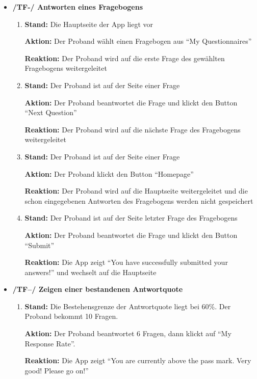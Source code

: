 \documentclass[a4paper]{scrreprt}
\begin{document}
\begin{itemize}
	        \item \textbf{/TF-/ Antworten eines Fragebogens}
	        \begin{enumerate}
	        	\item \par \textbf{Stand: }Die Hauptseite der App liegt vor
	        	\par \textbf{Aktion: }Der \gls{Proband} wählt einen Fragebogen aus ``My Questionnaires''
	        	\par \textbf{Reaktion: }Der \gls{Proband} wird auf die erste Frage des gewählten Fragebogens weitergeleitet
	        	\item \par \textbf{Stand: }Der \gls{Proband} ist auf der Seite einer Frage
	        	\par \textbf{Aktion: }Der \gls{Proband} beantwortet die Frage und klickt den Button ``Next Question''
	        	\par \textbf{Reaktion: }Der \gls{Proband} wird auf die nächste Frage des Fragebogens weitergeleitet
	        	\item \par \textbf{Stand: }Der \gls{Proband} ist auf der Seite einer Frage
	        	\par \textbf{Aktion: }Der \gls{Proband} klickt den Button ``Homepage''
	        	\par \textbf{Reaktion: }Der \gls{Proband} wird auf die Hauptseite weitergeleitet und die schon eingegebenen Antworten des Fragebogens werden nicht gespeichert
	        	\item \par \textbf{Stand: }Der \gls{Proband} ist auf der Seite letzter Frage des Fragebogens
	        	\par \textbf{Aktion: }Der \gls{Proband} beantwortet die Frage und klickt den Button ``Submit''
	        	\par \textbf{Reaktion: }Die App zeigt ``You have successfully submitted your answers!'' und wechselt auf die Hauptseite
	        \end{enumerate}

            \item \textbf{/TF--/ Zeigen einer bestandenen \gls{Antwortquote}}
            \begin{enumerate}
                \item \par \textbf{Stand: }Die Bestehensgrenze der \gls{Antwortquote} liegt bei 60\%. Der \gls{Proband} bekommt 10 Fragen.
                \par \textbf{Aktion: }Der \gls{Proband} beantwortet 6 Fragen, dann klickt auf “My Response Rate”.
                \par \textbf{Reaktion: }Die App zeigt “You are currently above the pass mark. Very good! Please go on!”
            \end{enumerate}


\end{itemize}
\end{document}

